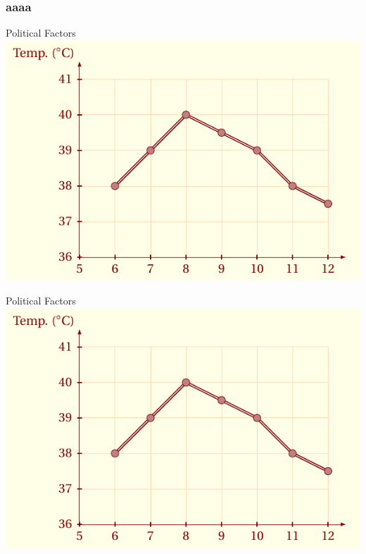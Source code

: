 \documentclass{article}
\begin{document}
\subsubsection{aaaa}
\begin{mybox}{Political Factors}
    \includegraphics[scale=.3]{pdf/cal_fun1.pdf}
    \tcblower
   \lipsum[1]
\end{mybox}
\begin{leftbox}{Political Factors}
    \lipsum[1]
    \tcblower
    \includegraphics[scale=.3]{pdf/cal_fun1.pdf}
   
\end{leftbox}
\end{document}
